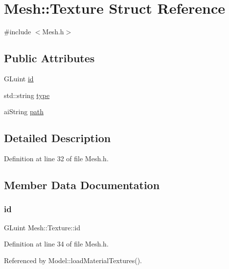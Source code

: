 \hypertarget{structMesh_1_1Texture}{}\section{Mesh\+:\+:Texture Struct Reference}
\label{structMesh_1_1Texture}


{\ttfamily \#include $<$Mesh.\+h$>$}

\subsection*{Public Attributes}
\begin{DoxyCompactItemize}
\item 
G\+Luint \mbox{\hyperlink{structMesh_1_1Texture_a74c3bcb5a2e98377f722d26a7901e7a5}{id}}
\item 
std\+::string \mbox{\hyperlink{structMesh_1_1Texture_afd1b4cc8fd445ce46e2d5fe5f4238d84}{type}}
\item 
ai\+String \mbox{\hyperlink{structMesh_1_1Texture_aa35695c6acc49df270b0c9d0926654d6}{path}}
\end{DoxyCompactItemize}


\subsection{Detailed Description}


Definition at line 32 of file Mesh.\+h.



\subsection{Member Data Documentation}
\mbox{\label{structMesh_1_1Texture_a74c3bcb5a2e98377f722d26a7901e7a5}} 
\subsubsection{\texorpdfstring{id}{id}}
{\footnotesize\ttfamily G\+Luint Mesh\+::\+Texture\+::id}



Definition at line 34 of file Mesh.\+h.



Referenced by Model\+::load\+Material\+Textures().

\mbox{\label{structMesh_1_1Texture_aa35695c6acc49df270b0c9d0926654d6}} 
